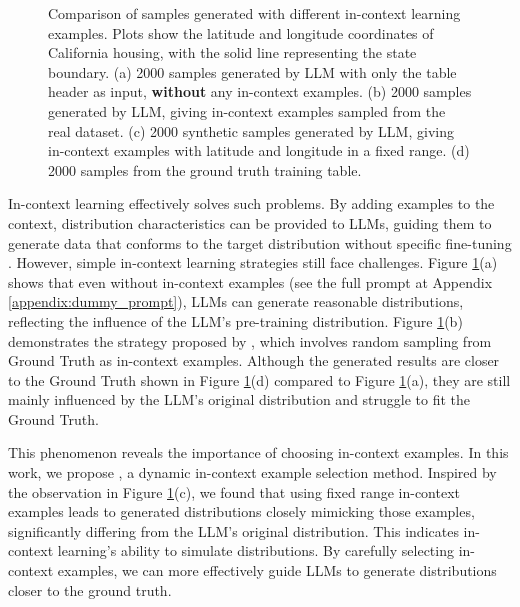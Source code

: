 \begin{figure}[t!] 
    \centering

    \hfill
    
    \hfill
\caption{Comparison of samples generated with different in-context learning examples. Plots show the latitude and longitude coordinates of California housing, with the solid line representing the state boundary.
(a) 2000 samples generated by LLM with only the table header as input, \textbf{without} any in-context examples.
(b) 2000 samples generated by LLM, giving in-context examples sampled from the real dataset.
(c) 2000 synthetic samples generated by LLM, giving in-context examples with latitude and longitude in a fixed range. (d) 2000 samples from the ground truth training table.}
\label{fig:in-context-examples}
\vspace{-1em}
\end{figure}



In-context learning effectively solves such problems. By adding examples to the context, distribution characteristics can be provided to LLMs, guiding them to generate data that conforms to the target distribution without specific fine-tuning \citep{gao2023retrieval}. However, simple in-context learning strategies still face challenges. Figure \ref{fig:in-context-examples}(a) shows that even without in-context examples (see the full prompt at Appendix \ref{appendix:dummy_prompt}), LLMs can generate reasonable distributions, reflecting the influence of the LLM's pre-training distribution. Figure \ref{fig:in-context-examples}(b) demonstrates the strategy proposed by \citep{cllm}, which involves random sampling from Ground Truth as in-context examples. Although the generated results are closer to the Ground Truth shown in Figure \ref{fig:in-context-examples}(d) compared to Figure \ref{fig:in-context-examples}(a), they are still mainly influenced by the LLM's original distribution and struggle to fit the Ground Truth.

This phenomenon reveals the importance of choosing in-context examples. In this work, we propose \modelname, a dynamic in-context example selection method. 
Inspired by the observation in Figure \ref{fig:in-context-examples}(c), we found that using fixed range in-context examples leads to generated distributions closely mimicking those examples, significantly differing from the LLM's original distribution. This indicates in-context learning's ability to simulate distributions. By carefully selecting in-context examples, we can more effectively guide LLMs to generate distributions closer to the ground truth.
 
